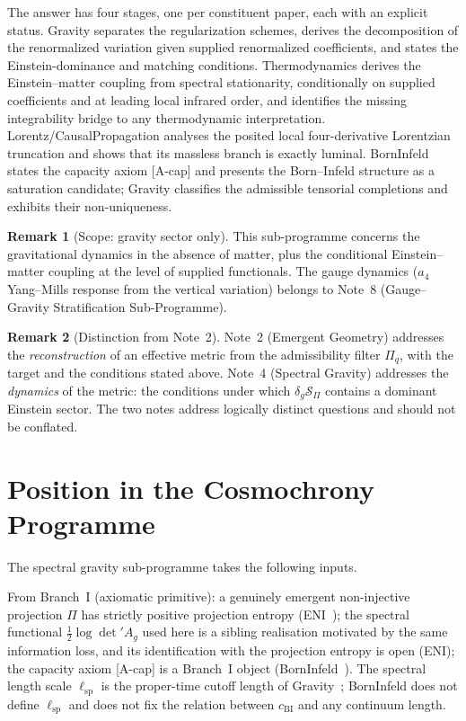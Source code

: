 \documentclass[11pt,a4paper]{article}
\theoremstyle{definition}
\newtheorem{remark}{Remark}
\newcommand{\SPI}{\mathcal{S}_\Pi}
\newcommand{\lsp}{\ell_{\mathrm{sp}}}
\newcommand{\cBI}{c_{\mathrm{BI}}}
\begin{document}
    \medskip
    The answer has four stages, one per constituent paper, each with an explicit status.
    Gravity separates the regularization schemes, derives the decomposition of the
    renormalized variation given supplied renormalized coefficients, and states the Einstein-dominance and
    matching conditions.
    Thermodynamics derives the Einstein--matter coupling from spectral stationarity,
    conditionally on supplied coefficients and at leading local infrared order, and identifies the missing
    integrability bridge
    to any thermodynamic interpretation.
    Lorentz/CausalPropagation analyses the posited local four-derivative Lorentzian
    truncation and shows that its massless branch is exactly luminal.
    BornInfeld states the capacity axiom [A-cap] and presents the Born--Infeld structure as
    a saturation candidate; Gravity classifies the admissible tensorial completions and
    exhibits their non-uniqueness.

    \begin{remark}[Scope: gravity sector only]
This sub-programme concerns the gravitational dynamics in the absence of matter, plus the
conditional Einstein--matter coupling at the level of supplied functionals.
The gauge dynamics ($a_4$ Yang--Mills response from the vertical variation) belongs to
Note~8 (Gauge--Gravity Stratification Sub-Programme).
    \end{remark}

    \begin{remark}[Distinction from Note~2]
Note~2 (Emergent Geometry) addresses the \emph{reconstruction} of an effective metric from the admissibility
filter $\Pi_q$, with the target and the conditions stated above.
Note~4 (Spectral Gravity) addresses the \emph{dynamics} of the metric: the conditions under
which $\delta_g\SPI$ contains a dominant Einstein sector.
The two notes address logically distinct questions and should not be conflated.
    \end{remark}

  \section{Position in the Cosmochrony Programme}
    \label{sec:position}

    The spectral gravity sub-programme takes the following inputs.

    From Branch~I (axiomatic primitive): a genuinely emergent non-injective projection $\Pi$ has strictly positive
    projection entropy (ENI~\cite{Beau2026l}); the spectral functional $\tfrac{1}{2}\log\det' A_g$ used here is a
    sibling realisation motivated by the same information loss, and its identification with the projection
    entropy is open (ENI); the capacity axiom [A-cap] is a Branch~I object (BornInfeld~\cite{Beau2026c}).
    The spectral length scale $\lsp$ is the proper-time cutoff length of Gravity~\cite{Beau2026h}; BornInfeld does
    not define $\lsp$ and does not fix the relation between $\cBI$ and any continuum length.
\end{document}
